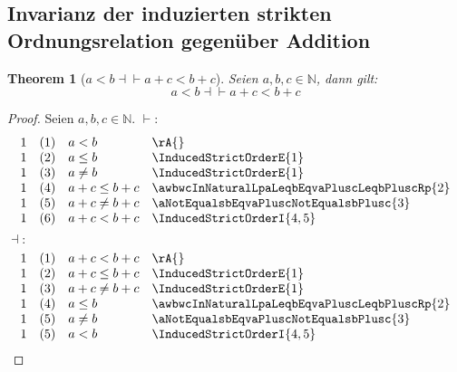 \documentclass{book}
\theoremstyle{plain}
\newtheorem{theorem}{Theorem}
\theoremstyle{remark}
\theoremstyle{definition}
\begin{document}
\subsection{Invarianz der induzierten strikten Ordnungsrelation gegenüber Addition}

\label{awbwcInNaturalLpaLneqbEqvaPluscLneqbPluscRp}
\begin{theorem}[\(a<b\dashv\vdash a+c<b+c\)]
Seien \(a,b,c\in\mathbb{N}\), dann gilt:
\[a<b\dashv\vdash a+c<b+c\]
\end{theorem}
\begin{proof}
        Seien \(a,b,c\in\mathbb{N}\). 
\(\vdash:\)
\[
\begin{array}{llll}
            1 & (1) & a<b  & \rA{} \\
            1 & (2) & a\leq b  & \InducedStrictOrderE{1} \\
            1 & (3) & a\neq b  & \InducedStrictOrderE{1} \\
            1 & (4) & a+c\leq b+c  &  \awbwcInNaturalLpaLeqbEqvaPluscLeqbPluscRp{2} \\
            1 & (5) & a+c\neq b+c  & \aNotEqualsbEqvaPluscNotEqualsbPlusc{3} \\
            1 & (6) & a+c<b+c & \InducedStrictOrderI{4,5} \\
\end{array}
\]
\(\dashv:\)
\[
\begin{array}{llll}
            1 & (1) & a+c<b+c  & \rA{} \\
            1 & (2) & a+c\leq b+c  & \InducedStrictOrderE{1} \\
            1 & (3) & a+c\neq b+c  & \InducedStrictOrderE{1} \\
            1 & (4) & a\leq b  & \awbwcInNaturalLpaLeqbEqvaPluscLeqbPluscRp{2}
            \\
            1 & (5) & a\neq b  & \aNotEqualsbEqvaPluscNotEqualsbPlusc{3}
            \\
            1 & (5) & a< b  & \InducedStrictOrderI{4,5}
            \\
            
\end{array}
\]
\end{proof}
\end{document}
